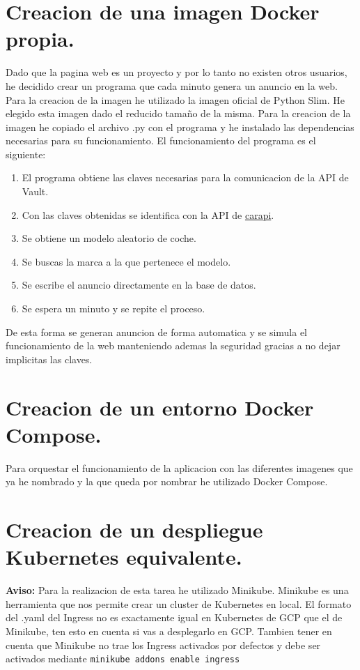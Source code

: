 \documentclass{report}
\begin{document}
        \section{Creacion de una imagen Docker propia.} 
            Dado que la pagina web es un proyecto y por lo tanto no existen otros usuarios, he decidido crear un programa que cada minuto genera un anuncio en la web.
            Para la creacion de la imagen he utilizado la imagen oficial de Python Slim.
            He elegido esta imagen dado el reducido tamaño de la misma.
            Para la creacion de la imagen he copiado el archivo .py con el programa y he instalado las dependencias necesarias para su funcionamiento.
            El funcionamiento del programa es el siguiente:
            \begin{enumerate}
                \item El programa obtiene las claves necesarias para la comunicacion de la API de Vault.
                \item Con las claves obtenidas se identifica con la API de \href{https://carapi.app/api#/}{carapi}.
                \item Se obtiene un modelo aleatorio de coche.
                \item Se buscas la marca a la que pertenece el modelo.
                \item Se escribe el anuncio directamente en la base de datos.
                \item Se espera un minuto y se repite el proceso.
            \end{enumerate}
            De esta forma se generan anuncion de forma automatica y se simula el funcionamiento de la web manteniendo ademas la seguridad gracias a no dejar implicitas las claves.
        \clearpage
        \section{Creacion de un entorno Docker Compose.}
            Para orquestar el funcionamiento de la aplicacion con las diferentes imagenes que ya he nombrado y la que queda por nombrar he utilizado Docker Compose.

        \clearpage
        \section{Creacion de un despliegue Kubernetes equivalente.}
            \textbf{Aviso:} Para la realizacion de esta tarea he utilizado Minikube. Minikube es una herramienta que nos permite crear un cluster de Kubernetes en local. El formato del .yaml del Ingress no es exactamente igual en Kubernetes de GCP que el de Minikube, ten esto en cuenta si vas a desplegarlo en GCP. Tambien tener en cuenta que Minikube no trae los Ingress activados por defectos y debe ser activados mediante \texttt{minikube addons enable ingress}\\
\end{document}
